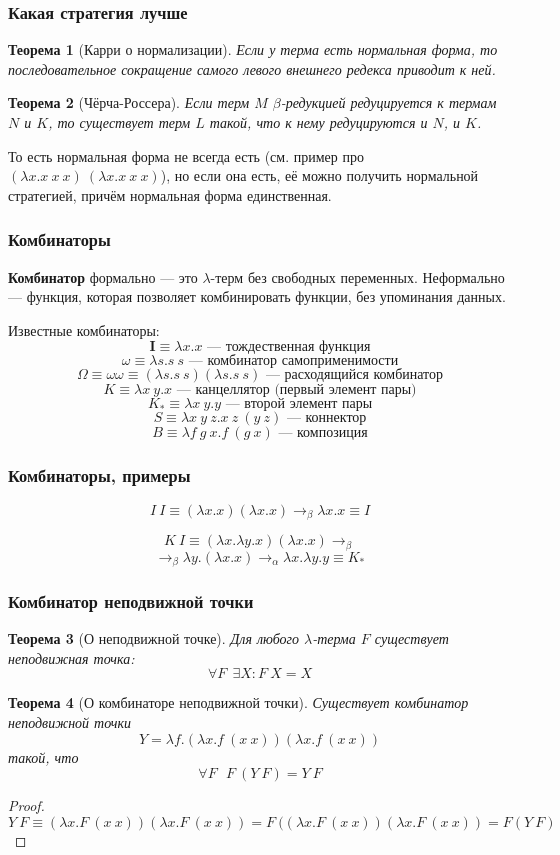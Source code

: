 \documentclass[xetex,mathserif,serif]{beamer}
\newtheorem{rustheorem}{Теорема}
\begin{document}
	\begin{frame}
		\frametitle{Какая стратегия лучше}
		\begin{rustheorem}[Карри о нормализации]
			Если у терма есть нормальная форма, то последовательное сокращение самого левого внешнего 
			редекса приводит к ней.
		\end{rustheorem}
		\begin{rustheorem}[Чёрча-Россера]
			Если терм $M$ $\beta$-редукцией редуцируется к термам $N$ и $K$, то существует терм $L$ такой, что
			к нему редуцируются и $N$, и $K$.
		\end{rustheorem}
		То есть нормальная форма не всегда есть (см. пример про $(\lambda x.x\ x\ x)\ (\lambda x.x\ x\ x)$), но
		если она есть, её можно получить нормальной стратегией, причём нормальная форма единственная.
	\end{frame}

	\begin{frame}
		\frametitle{Комбинаторы}
		\textbf{Комбинатор} формально --- это $\lambda$-терм без свободных переменных. Неформально --- функция,
		которая позволяет комбинировать функции, без упоминания данных.
		
		Известные комбинаторы:
		$$\textbf{I} \equiv \lambda x.x \mbox{ --- тождественная функция}$$
		$$\omega \equiv \lambda s.s\ s \mbox{ --- комбинатор самоприменимости}$$
		$$\Omega \equiv \omega\omega \equiv (\lambda s.s\ s) (\lambda s.s\ s) \mbox{ --- расходящийся комбинатор}$$
		$$K \equiv \lambda x\ y.x \mbox{ --- канцеллятор (первый элемент пары)}$$
		$$K_\ast \equiv \lambda x\ y.y \mbox{ --- второй элемент пары}$$
		$$S \equiv \lambda x\ y\ z. x\ z\ (y\ z) \mbox{ --- коннектор}$$
		$$B \equiv \lambda f\ g\ x. f\ (g\ x) \mbox{ --- композиция}$$		
	\end{frame}
	
	\begin{frame}
		\frametitle{Комбинаторы, примеры}
		$$I\ I \equiv (\lambda x.x) (\lambda x.x) \rightarrow_\beta \lambda x.x \equiv I$$		
				
		$$K\ I \equiv (\lambda x.\lambda y.x) (\lambda x.x) \rightarrow_\beta $$		
		$$\rightarrow_\beta \lambda y.(\lambda x.x) \rightarrow_\alpha \lambda x.\lambda y.y \equiv K_\ast$$		
	\end{frame}
		

	\begin{frame}
		\frametitle{Комбинатор неподвижной точки}
		\begin{rustheorem}[О неподвижной точке]
			Для любого $\lambda$-терма $F$ существует неподвижная точка:
			$$\forall F\ \ \exists X : F\ X = X$$
		\end{rustheorem}
		\begin{rustheorem}[О комбинаторе неподвижной точки]
			Существует комбинатор неподвижной точки
			$$Y = \lambda f.(\lambda x.f\ (x\ x)) (\lambda x.f\ (x\ x))$$
			такой, что 
			$$\forall F\ \ \ F\ (Y\ F) = Y\ F$$
		\end{rustheorem}
		\begin{proof}
			$$Y\ F \equiv (\lambda x.F\ (x\ x))(\lambda x.F\ (x\ x)) 
				= F\ ((\lambda x.F\ (x\ x))(\lambda x.F\ (x\ x)) = F(Y\ F)$$
		\end{proof}		
	\end{frame}
\end{document}
